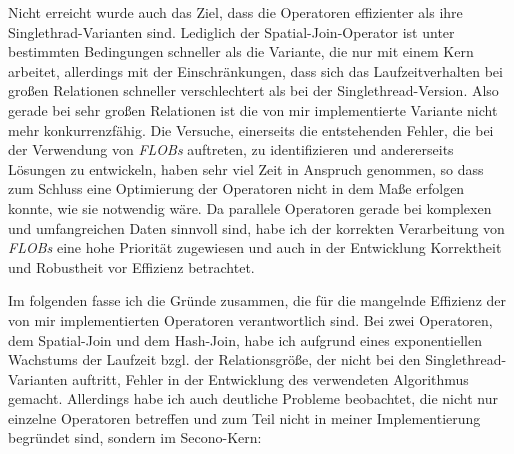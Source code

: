 \documentclass[a4paper,12pt,twoside]{article}
\newcommand{\Fb}[1]{\textit{#1}} %
\begin{document}
{Nicht erreicht wurde auch das Ziel, dass die Operatoren effizienter als ihre Singlethrad-Varianten sind. Lediglich der Spatial-Join-Operator ist unter bestimmten Bedingungen schneller als die Variante, die nur mit einem Kern arbeitet, allerdings mit der Einschränkungen, dass sich das Laufzeitverhalten bei großen Relationen schneller verschlechtert als bei der Singlethread-Version. Also gerade bei sehr großen Relationen ist die von mir implementierte Variante nicht mehr konkurrenzfähig. Die Versuche, einerseits die entstehenden Fehler, die bei der Verwendung von \Fb{FLOBs} auftreten, zu identifizieren und andererseits Lösungen zu entwickeln, haben sehr viel Zeit in Anspruch genommen, so dass zum Schluss eine Optimierung der Operatoren nicht in dem Maße erfolgen konnte, wie sie notwendig wäre. Da parallele Operatoren gerade bei komplexen und umfangreichen Daten sinnvoll sind, habe ich der korrekten Verarbeitung von \Fb{FLOBs} eine hohe Priorität zugewiesen und auch in der Entwicklung Korrektheit und Robustheit vor Effizienz betrachtet.

Im folgenden fasse ich die Gründe zusammen, die für die mangelnde Effizienz der von mir implementierten Operatoren verantwortlich sind. Bei zwei Operatoren, dem Spatial-Join und dem Hash-Join, habe ich aufgrund eines exponentiellen Wachstums der Laufzeit bzgl. der Relationsgröße, der nicht bei den Singlethread-Varianten auftritt, Fehler in der Entwicklung des verwendeten Algorithmus gemacht. Allerdings habe ich auch deutliche Probleme beobachtet, die nicht nur einzelne Operatoren betreffen und zum Teil nicht in meiner Implementierung begründet sind, sondern im Secono-Kern:

}
\end{document}
